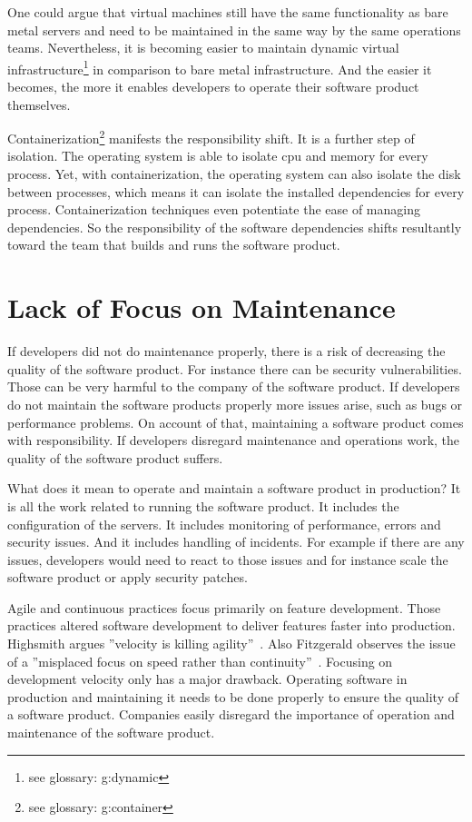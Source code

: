 One could argue that virtual machines still have the same functionality as bare metal
servers and need to be maintained in the same way by the same operations
teams. Nevertheless, it is becoming easier to maintain dynamic virtual
infrastructure\footnote{see glossary: \gls{g:dynamic}} in comparison to bare metal
infrastructure. And the easier it becomes, the more it enables developers to operate their
software product themselves.

Containerization\footnote{see glossary: \gls{g:container}} manifests the responsibility
shift. It is a further step of isolation. The operating system is able to isolate \gls{cpu} and
memory for every process. Yet, with containerization, the operating system can also isolate
the disk between processes, which means it can isolate the installed dependencies for
every process. Containerization techniques even potentiate the ease of managing
dependencies. So the responsibility of the software dependencies shifts resultantly
toward the team that builds and runs the software product.


\section{Lack of Focus on Maintenance}

If developers did not do maintenance properly, there is a risk of decreasing the quality
of the software product. For instance there can be security vulnerabilities. Those can be
very harmful to the company of the software product. If developers do not maintain the
software products properly more issues arise, such as bugs or performance problems. On
account of that, maintaining a software product comes with responsibility. If developers
disregard maintenance and operations work, the quality of the software product suffers.

What does it mean to operate and maintain a software product in production? It is all the
work related to running the software product. It includes the configuration of the
servers. It includes monitoring of performance, errors and security issues. And it
includes handling of incidents. For example if there are any issues, developers would need to
react to those issues and for instance scale the software product or apply
security patches.

Agile and continuous practices focus primarily on feature development. Those practices
altered software development to deliver features faster into production. Highsmith argues
”velocity is killing agility”~\cite{velocity_kills}. Also Fitzgerald observes the issue of
a ”misplaced focus on speed rather than continuity”~\cite{continuous_fitzgerald}. Focusing
on development velocity only has a major drawback. Operating software in production and
maintaining it needs to be done properly to ensure the quality of a software
product. Companies easily disregard the importance of operation and maintenance of the
software product.


